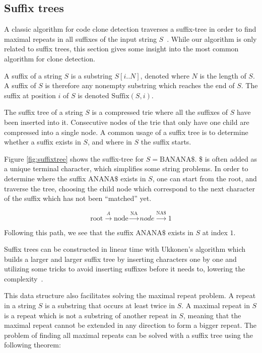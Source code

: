 \subsection*{Suffix trees}

A classic algorithm for code clone detection traverses a suffix-tree in order to find
maximal repeats in all suffixes of the input string $S$~\cite{Zibran_real_time_search,
GodeIncrementalCloneDetection}. While our algorithm is only related to suffix trees, this
section gives some insight into the most common algorithm for clone detection.

A suffix of a string $S$ is a substring $S[i..N]$, denoted where $N$ is the length of $S$.
A suffix of $S$ is therefore any nonempty substring which reaches the end of $S$. The
suffix at position $i$ of $S$ is denoted $\text{Suffix}(S, i)$.

The suffix tree of a string $S$ is a compressed trie where all the suffixes of $S$ have
been inserted into it. Consecutive nodes of the trie that only have one child are
compressed into a single node. A common usage of a suffix tree is to determine whether a
suffix exists in $S$, and where in $S$ the suffix starts.

Figure \ref{fig:suffixtree} shows the suffix-tree for $S=\text{BANANA\$}$. \$ is often
added as a unique terminal character, which simplifies some string problems. In order to
determine where the suffix $\text{ANANA\$}$ exists in $S$, one can start from the root,
and traverse the tree, choosing the child node which correspond to the next character of
the suffix which has not been ``matched'' yet.

$$
\text{root} \xrightarrow{A} \text{node} \xrightarrow{\text{NA}} node \xrightarrow{\text{NA\$}} 1
$$

Following this path, we see that the suffix $\text{ANANA\$}$ exists in $S$ at index $1$.

Suffix trees can be constructed in linear time with Ukkonen's algorithm which builds a
larger and larger suffix tree by inserting characters one by one and utilizing some tricks
to avoid inserting suffixes before it needs to, lowering the complexity~\cite{Ukkonen}.

This data structure also facilitates solving the maximal repeat problem. A repeat in a
string $S$ is a substring that occurs at least twice in $S$. A maximal repeat in $S$ is a repeat
which is not a substring of another repeat in $S$, meaning that the maximal repeat cannot be
extended in any direction to form a bigger repeat. The problem of finding all maximal
repeats can be solved with a suffix tree using the following theorem:

